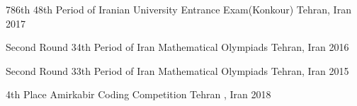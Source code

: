 



\begin{cvhonors}

  \cvhonor
    {786th} %
    {48th Period of Iranian University Entrance Exam(Konkour)} %
    {Tehran, Iran} %
    {2017} %

  \cvhonor
    {Second Round} %
    {34th Period of Iran Mathematical Olympiads} %
    {Tehran, Iran} %
    {2016} %



  \cvhonor
    {Second Round} %
    {33th Period of Iran Mathematical Olympiads} %
    {Tehran, Iran} %
    {2015} %


\end{cvhonors}




\begin{cvhonors}

  \cvhonor
    {4th Place} %
    {Amirkabir Coding Competition} %
    {Tehran , Iran} %
    {2018} %
\end{cvhonors}
